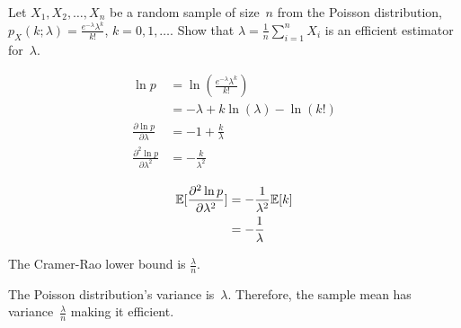 \begin{problem}
   Let ${X_1,X_2,\ldots,X_n}$ be a random sample of size~$n$ from the Poisson distribution, ${p_{X}(k;\lambda) = \frac{e^{-\lambda} \lambda^{k}}{k!}}$, ${k=0,1,\ldots}$. Show that ${\hat{\lambda} = \frac{1}{n} \sum_{i=1}^{n} X_i}$ is an efficient estimator for~$\lambda$.
\end{problem}

\begin{align}
  \ln p &= \ln \left( \frac{e^{-\lambda} \lambda^{k}}{k!} \right) \\
        &= -\lambda + k\ln(\lambda) - \ln(k!) \\
  \frac{\partial \ln p}{\partial \lambda} &= -1 +\frac{k}{\lambda} \\
  \frac{\partial^2 \ln p}{\partial \lambda^2} &= -\frac{k}{\lambda^2}
\end{align}

\begin{align}
  \mathbb{E}\lbrack\frac{\partial^2 \ln p}{\partial \lambda^2}\rbrack &= -\frac{1}{\lambda^2} \mathbb{E}\lbrack k\rbrack \\
                                                       &= -\frac{1}{\lambda}
\end{align}

The Cramer-Rao lower bound is ${\boxed{\frac{\lambda}{n}}}$.

The Poisson distribution's variance is~$\lambda$.  Therefore, the sample mean has variance~${\frac{\lambda}{n}}$ making it efficient.
